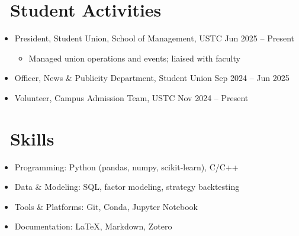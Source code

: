 \documentclass[11pt]{article}
\begin{document}
\section[Student Activities]{{\mdseries\makebox[\widthof{\faGraduationCap}][c]{\color{CVBlue}\faUsers}}\ Student Activities}

\begin{itemize}
    \item President, Student Union, School of Management, USTC \hfill Jun 2025 -- Present
          \begin{itemize}
              \item Managed union operations and events; liaised with faculty
          \end{itemize}

    \item Officer, News \& Publicity Department, Student Union \hfill Sep 2024 -- Jun 2025

    \item Volunteer, Campus Admission Team, USTC \hfill Nov 2024 -- Present
\end{itemize}


\section[Skills]{{\mdseries\makebox[\widthof{\faGraduationCap}][c]{\color{CVBlue}\faWrench}}\ Skills}

\begin{itemize}
    \item Programming: Python (pandas, numpy, scikit-learn), C/C++
    \item Data \& Modeling: SQL, factor modeling, strategy backtesting
    \item Tools \& Platforms: Git, Conda, Jupyter Notebook
    \item Documentation: \LaTeX{}, Markdown, Zotero
\end{itemize}


\end{document}
